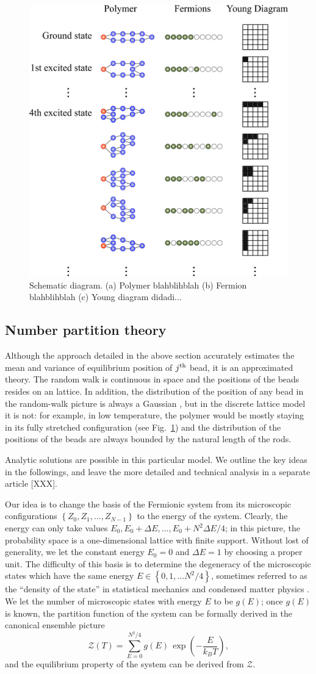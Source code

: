 \documentclass[aps,showpacs,twocolumn,floatfix,prx,superscriptaddress]{revtex4-1}
\begin{document}
\begin{figure}
\includegraphics[width=0.45 \textwidth]{schematic}
\caption{Schematic diagram. (a) Polymer blahblihblah (b) Fermion blahblihblah (c) Young diagram didadi...}
\label{fig:schematic}
\end{figure}

\subsection{Number partition theory} 
Although the approach detailed in the above section accurately estimates
the mean and variance of equilibrium position of $j^{\rm th}$ bead, it is an
approximated theory. The random walk is continuous in space and the positions of
the beads resides on an lattice. In addition, the distribution of the position
of any bead in the random-walk picture is always a Gaussian
\cite{Lin2015}, but in the discrete lattice model it is not:
for example, in low temperature, the polymer would be mostly staying in its
fully stretched configuration (see Fig.~\ref{fig:schematic}) and the
distribution of the positions of the beads are always bounded by the natural
length of the rods. 

Analytic solutions are possible in this particular model. We outline the key
ideas in the followings, and leave the more detailed and technical analysis in a
separate article [XXX]. 

Our idea is to change the basis of the Fermionic system from its microscopic
configurations $\left\{Z_0,Z_1,\ldots,Z_{N-1}\right\}$ to the energy of the system.
Clearly, the energy can only take values $E_0, E_0+\Delta E, \ldots, E_0 + N^2
\Delta E / 4$; in this picture, the probability space is a one-dimensional
lattice with finite support. Without lost of generality, we let the constant
energy $E_0=0$ and $\Delta E=1$ by choosing a proper unit. The difficulty of
this basis is to determine the degeneracy of the microscopic states which have
the same energy $E \in \left\{0,1,\ldots N^2/4\right\}$, sometimes referred to as the
``density of the state'' in statistical mechanics \cite{Chandler1987,Huang2001}
and condensed matter physics \cite{Sander2009}. We let the number of
microscopic states with energy $E$ to be $g(E)$; once $g(E)$ is known, the
partition function of the system can be formally derived in the canonical
ensemble picture
\begin{equation}
    \label{partition_func}
    \mathcal{Z}\left(T\right) = \sum_{E=0}^{N^2/4} g(E) \, \exp
    \left(-\frac{E}{k_B T}\right),
\end{equation}
and the equilibrium property of the system can be derived from $\mathcal{Z}$. 
\end{document}
